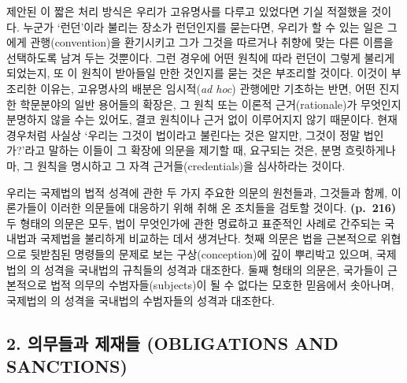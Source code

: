 제안된 이 짧은 처리 방식은 우리가 고유명사를 다루고 있었다면 기실
적절했을 것이다. 누군가 ‘런던’이라 불리는 장소가 
런던인지를 묻는다면, 우리가 할 수 있는 일은 그에게 관행(convention)을
환기시키고 그가 그것을 따르거나 취향에 맞는 다른 이름을 선택하도록 남겨
두는 것뿐이다. 그런 경우에 어떤 원칙에 따라 런던이 그렇게 불리게
되었는지, 또 이 원칙이 받아들일 만한 것인지를 묻는 것은 부조리할 것이다.
이것이 부조리한 이유는, 고유명사의 배분은  임시적(\emph{ad
hoc}) 관행에만 기초하는 반면, 어떤 진지한 학문분야의 일반 용어들의
확장은, 그 원칙 또는 이론적 근거(rationale)가 무엇인지 분명하지 않을
수는 있어도, 결코 원칙이나 근거 없이 이루어지지 않기 때문이다. 현재
경우처럼 사실상 ‘우리는 그것이 법이라고 불린다는 것은 알지만, 그것이
정말 법인가?’라고 말하는 이들이 그 확장에 의문을 제기할 때, 요구되는
것은, 분명 흐릿하게나마, 그 원칙을 명시하고 그 자격
근거들(credentials)을 심사하라는 것이다.

우리는 국제법의 법적 성격에 관한 두 가지 주요한 의문의 원천들과,
그것들과 함께, 이론가들이 이러한 의문들에 대응하기 위해 취해 온 조치들을
검토할 것이다. \textbf{(p.~216)} 두 형태의 의문은 모두, 법이 무엇인가에
관한 명료하고 표준적인 사례로 간주되는 국내법과 국제법을 불리하게
비교하는 데서 생겨난다. 첫째 의문은 법을 근본적으로 위협으로 뒷받침된
명령들의 문제로 보는 구상(conception)에 깊이 뿌리박고 있으며, 국제법의
의 성격을 국내법의 규칙들의 성격과 대조한다. 둘째
형태의 의문은, 국가들이 근본적으로 법적 의무의 수범자들(subjects)이 될
수 없다는 모호한 믿음에서 솟아나며, 국제법의 의
성격을 국내법의 수범자들의 성격과 대조한다.

\subsection{2. 의무들과 제재들 (OBLIGATIONS AND
SANCTIONS)}\label{uxc758uxbb34uxb4e4uxacfc-uxc81cuxc7acuxb4e4-obligations-and-sanctions}

